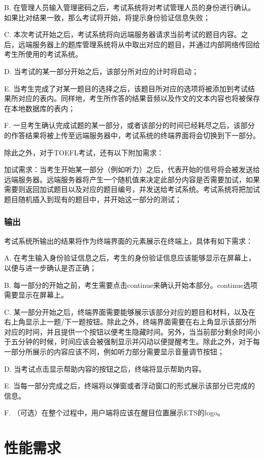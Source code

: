 B. 在管理人员输入管理密码之后，考试系统将对考试管理人员的身份进行确认。如果比对结果一致，那么考试将开始，将提示身份验证信息失败；

C. 本次考试开始之后，考试系统将向远端服务器请求当前考试的题目内容。之后，远端服务器上的题库管理系统将从中取出对应的题目，并通过内部网络传回给考生所使用的考试系统。

D. 当考试的某一部分开始之后，该部分所对应的计时将启动；

E. 当考生完成了对某一题目的选择之后，该题目所对应的选项将被添加到考试结果所对应的表内。同样地，考生所作答的结果音频以及作文的文本内容也将被保存在本地数据库的表内；

F. 一旦考生确认完成试题的某一部分，或者该部分的时间已经耗尽之后，该部分的作答结果将被上传至远端服务器中，考试系统的终端界面将会切换到下一部分。

除此之外，对于TOEFL考试，还有以下附加需求：

加试需求：当考生开始某一部分（例如听力）之后，代表开始的信号将会被发送给远端服务器。远端服务器将产生一个随机值来决定此部分内容是否需要加试，如果需要则返回加试题目以及对应的题目编号，并发送给考试系统。考试系统将把加试题目随机插入到现有的题目中，并开始这一部分的测试；

\subsubsection{输出}
考试系统所输出的结果将作为终端界面的元素展示在终端上，具体有如下需求：

A. 在考生输入身份验证信息之后，考生的身份验证信息应该能够显示在屏幕上，以便与进一步确认是否正确；

B. 每一部分的开始之前，考生需要点击continue来确认开始本部分。continue选项需要显示在屏幕上。

C. 某一部分开始之后，终端界面需要能够展示该部分对应的题目和材料，以及在右上角显示上一题/下一题按钮。除此之外，终端界面需要在右上角显示该部分所对应的时间，并且提供一个按钮以便考生隐藏时间。另外，当当前部分剩余时间小于五分钟的时候，时间应该会被强制显示并闪动以便提醒考生。除此之外，对于每一部分所展示的内容应该不同，例如听力部分需要显示音量调节按钮；

D. 当考试点击显示帮助内容的按钮之后，终端将显示帮助内容。

E. 当每一部分完成之后，终端将以弹窗或者浮动窗口的形式展示该部分已完成的信息。

F. （可选）在整个过程中，用户端将应该在醒目位置展示ETS的logo。



\section{性能需求}

